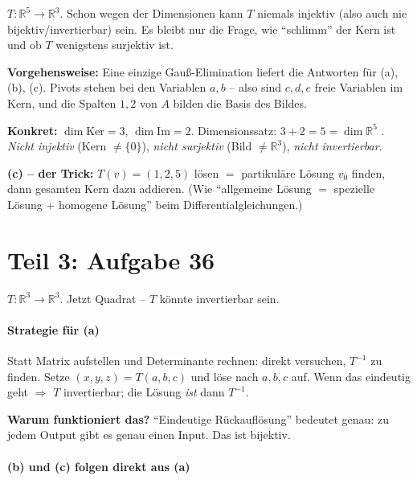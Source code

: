 \documentclass[a4paper,12pt]{article}
\begin{document}
$T \colon \mathbb{R}^5 \to \mathbb{R}^3$. Schon wegen der Dimensionen kann $T$ niemals injektiv (also auch nie bijektiv/invertierbar) sein. Es bleibt nur die Frage, wie ``schlimm'' der Kern ist und ob $T$ wenigstens surjektiv ist.

\medskip

\textbf{Vorgehensweise:} Eine einzige Gau\ss-Elimination liefert die Antworten f\"ur (a), (b), (c). Pivots stehen bei den Variablen $a, b$ -- also sind $c, d, e$ freie Variablen im Kern, und die Spalten $1, 2$ von $A$ bilden die Basis des Bildes.

\medskip

\textbf{Konkret:} $\dim \text{Ker} = 3$, $\dim \text{Im} = 2$. Dimensionssatz: $3 + 2 = 5 = \dim \mathbb{R}^5$ \checkmark. \emph{Nicht injektiv} (Kern $\neq \{0\}$), \emph{nicht surjektiv} (Bild $\neq \mathbb{R}^3$), \emph{nicht invertierbar}.

\medskip

\textbf{(c) -- der Trick:} $T(v) = (1, 2, 5)$ l\"osen $=$ partikul\"are L\"osung $v_0$ finden, dann gesamten Kern dazu addieren. (Wie ``allgemeine L\"osung $=$ spezielle L\"osung $+$ homogene L\"osung'' beim Differentialgleichungen.)

\newpage

\part*{Teil 3: Aufgabe 36}

$T \colon \mathbb{R}^3 \to \mathbb{R}^3$. Jetzt Quadrat -- $T$ k\"onnte invertierbar sein.

\subsection*{Strategie f\"ur (a)}

Statt Matrix aufstellen und Determinante rechnen: direkt versuchen, $T^{-1}$ zu finden. Setze $(x, y, z) = T(a, b, c)$ und l\"ose nach $a, b, c$ auf. Wenn das eindeutig geht $\Rightarrow$ $T$ invertierbar; die L\"osung \emph{ist} dann $T^{-1}$.

\textbf{Warum funktioniert das?} ``Eindeutige R\"uckaufl\"osung'' bedeutet genau: zu jedem Output gibt es genau einen Input. Das ist bijektiv.

\subsection*{(b) und (c) folgen direkt aus (a)}
\end{document}
